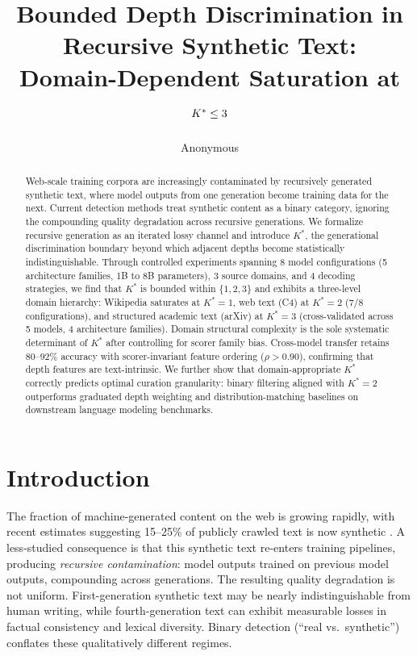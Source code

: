\documentclass[11pt,a4paper]{article}
\title{Bounded Depth Discrimination in Recursive Synthetic Text:\\Domain-Dependent Saturation at $\Kstar \leq 3$}
\author{Anonymous}
\date{}
\newcommand{\Kstar}{K^{*}}
\begin{document}
\maketitle

\begin{abstract}
Web-scale training corpora are increasingly contaminated by recursively generated synthetic text, where model outputs from one generation become training data for the next. Current detection methods treat synthetic content as a binary category, ignoring the compounding quality degradation across recursive generations. We formalize recursive generation as an iterated lossy channel and introduce $\Kstar$, the generational discrimination boundary beyond which adjacent depths become statistically indistinguishable. Through controlled experiments spanning 8 model configurations (5 architecture families, 1B to 8B parameters), 3 source domains, and 4 decoding strategies, we find that $\Kstar$ is bounded within $\{1, 2, 3\}$ and exhibits a three-level domain hierarchy: Wikipedia saturates at $\Kstar = 1$, web text (C4) at $\Kstar = 2$ (7/8 configurations), and structured academic text (arXiv) at $\Kstar = 3$ (cross-validated across 5 models, 4 architecture families). Domain structural complexity is the sole systematic determinant of $\Kstar$ after controlling for scorer family bias. Cross-model transfer retains 80--92\% accuracy with scorer-invariant feature ordering ($\rho > 0.90$), confirming that depth features are text-intrinsic. We further show that domain-appropriate $\Kstar$ correctly predicts optimal curation granularity: binary filtering aligned with $\Kstar = 2$ outperforms graduated depth weighting and distribution-matching baselines on downstream language modeling benchmarks.
\end{abstract}

\section{Introduction}
\label{sec:intro}

The fraction of machine-generated content on the web is growing rapidly, with recent estimates suggesting 15--25\% of publicly crawled text is now synthetic \citep{anthropic2025synthetic}. A less-studied consequence is that this synthetic text re-enters training pipelines, producing \emph{recursive contamination}: model outputs trained on previous model outputs, compounding across generations. The resulting quality degradation is not uniform. First-generation synthetic text may be nearly indistinguishable from human writing, while fourth-generation text can exhibit measurable losses in factual consistency and lexical diversity. Binary detection (``real vs.\ synthetic'') conflates these qualitatively different regimes.
\end{document}
